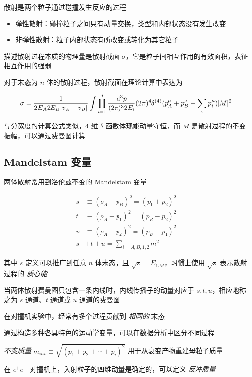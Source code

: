 散射是两个粒子通过碰撞发生反应的过程

\begin{itemize}
    \item 弹性散射：碰撞粒子之间只有动量交换，类型和内部状态没有发生改变
    \item 非弹性散射：粒子内部状态有所改变或转化为其它粒子
\end{itemize}

描述散射过程本质的物理量是散射截面 $\sigma$，它是粒子间相互作用的有效面积，表征相互作用的强弱

对于末态为 $n$ 体的散射过程，散射截面在理论计算中表达为

\begin{equation}
    \sigma = \frac{1}{2 E_A 2 E_B |v_A-v_B|} \int \prod_{i=1}^n \frac{\mathop{}\!\mathrm{d}^3 p}{(2\pi)^3 2 E_i} (2\pi)^4 \delta^{(4)} (p^\mu_A + p^\mu_B - \sum_i p^\mu_i) |M|^2
\end{equation}

与分宽度的计算公式类似，$4$ 维 $\delta$ 函数体现能动量守恒，而 $M$ 是散射过程的不变振幅，可以通过费曼图计算

\subsection{Mandelstam 变量}

两体散射常用到洛伦兹不变的 Mandelstam 变量

\begin{align}
    s &\equiv (p_A + p_B)^2 = (p_1 + p_2)^2 \\
    t &\equiv (p_A - p_1)^2 = (p_B - p_2)^2 \\
    u &\equiv (p_A - p_2)^2 = (p_B - p_1)^2 \\
    s &+t+u = \sum_{i=A,B,1,2} m^2
\end{align}

其中 $s$ 定义可以推广到任意 $n$ 体末态，且 $\sqrt{s}=E_{CM}$，习惯上使用 $\sqrt{s}$ 表示散射过程的 \emph{质心能}

当两体散射费曼图只包含一条内线时，内线传播子的动量对应于 $s, t, u$，相应地称之为 $s$ 通道、$t$ 通道或 $u$ 通道的费曼图

在对撞机实验中，经常有多个过程贡献到 \emph{相同的} 末态

通过构造多种各具特色的运动学变量，可以在数据分析中区分不同过程

\emph{不变质量} $m_{inv} \equiv \sqrt{(p_1 + p_2 + \cdots + p_i)^2}$ 用于从衰变产物重建母粒子质量

在 $e^+ e^-$ 对撞机上，入射粒子的四维动量是确定的，可以定义 \emph{反冲质量}

